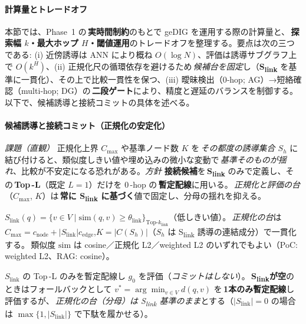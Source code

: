 \documentclass[ja=standard,xelatex]{bxjsarticle}
\begin{document}
\paragraph{計算量とトレードオフ}
本節では、Phase~1 の\,\textbf{実時間制約}のもとで geDIG を運用する際の計算量と、\,\textbf{探索幅 $k$・最大ホップ $H$・閾値運用}のトレードオフを整理する。要点は次の三つである: (i) 近傍誘導は ANN により概ね $O(\log N)$、評価は誘導サブグラフ上で $O(k^H)$、(ii) 正規化尺の循環依存を避けるため\,\emph{候補台を固定}し（\textbf{S\textsubscript{link}} を基準に一貫化）、その上で比較一貫性を保つ、(iii) 曖昧検出（0‑hop; AG）→短絡確認（multi‑hop; DG）の\,\textbf{二段ゲート}により、精度と遅延のバランスを制御する。以下で、候補誘導と接続コミットの具体を述べる。

\paragraph{候補誘導と接続コミット（正規化の安定化）}
\textit{課題（直観）}\; 正規化上界 $C_{\max}$ や基準ノード数 $K$ を\,\emph{その都度の誘導集合 $S_h$} に結び付けると、類似度しきい値や埋め込みの微小な変動で\,\emph{基準そのものが揺れ}、比較が不安定になる恐れがある。\;\textit{方針}\; \textbf{接続候補}を\,\textbf{S\textsubscript{link}} のみで定義し、その\,\textbf{Top\,\mbox{-}L}（既定 $L{=}1$）だけを 0\,\mbox{-}hop の\,\textbf{暫定配線}に用いる。\,\emph{正規化と評価の台}（$C_{\max}$, $K$）は\,\textbf{常に S\textsubscript{link} に基づく}値で固定し、分母の揺れを抑える。

\begin{description}[leftmargin=1.8em,labelwidth=5.2em]
  \item[接続候補] $\displaystyle S_{\mathrm{link}}(q)=\big\{v\in V\;\big|\;\mathrm{sim}(q,v)\ge\theta_{\mathrm{link}}\big\}_{\mathrm{Top}\text{-}k_{\mathrm{link}}}$（低しきい値）。\,\emph{正規化の台}は $C_{\max}{=}c_{\mathrm{node}}{+}|S_{\mathrm{link}}|c_{\mathrm{edge}}$,\;$K{=}|C(S_h)|$（$S_h$ は S\textsubscript{link} 誘導の連結成分）で一貫化する。\,類似度 $\mathrm{sim}$ は cosine／正規化 L2／weighted L2 のいずれでもよい（PoC: weighted L2、RAG: cosine）。
  \item[0-hop評価] $S_{\mathrm{link}}$ の Top\,\mbox{-}L のみを暫定配線し $g_0$ を評価（\emph{コミットはしない}）。\,\textbf{S\textsubscript{link}が空}のときはフォールバックとして $v^*{=}\arg\min_{v\in V} d(q,v)$ を\,\textbf{1本のみ暫定配線}し評価するが、\,\emph{正規化の台（分母）は S\textsubscript{link} 基準のまま}とする（$|S_{\mathrm{link}}|{=}0$ の場合は $\max\{1,|S_{\mathrm{link}}|\}$ で下駄を履かせる）。
\end{description}
\end{document}
